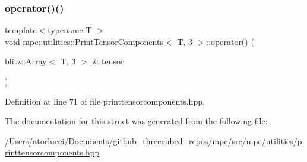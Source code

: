 \subsubsection{\texorpdfstring{operator()()}{operator()()}}
{\footnotesize\ttfamily template$<$typename T $>$ \\
void \mbox{\hyperlink{structmpc_1_1utilities_1_1_print_tensor_components}{mpc\+::utilities\+::\+Print\+Tensor\+Components}}$<$ T, 3 $>$\+::operator() (\begin{DoxyParamCaption}\item[{blitz\+::\+Array$<$ T, 3 $>$ \&}]{tensor }\end{DoxyParamCaption})\hspace{0.3cm}{\ttfamily [inline]}}



Definition at line 71 of file printtensorcomponents.\+hpp.



The documentation for this struct was generated from the following file\+:\begin{DoxyCompactItemize}
\item 
/\+Users/atorlucci/\+Documents/github\+\_\+threecubed\+\_\+repos/mpc/src/mpc/utilities/\mbox{\hyperlink{printtensorcomponents_8hpp}{printtensorcomponents.\+hpp}}\end{DoxyCompactItemize}
